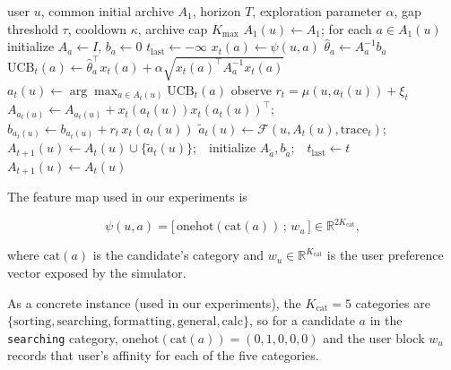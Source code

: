 \documentclass{article} %
\renewcommand{\eqref}[1]{\textup{(\ref{#1})}}
\begin{document}
\begin{algorithm}[t]
\caption{HyperRidge-Base (HRB): per-user routing over a growing archive}
\label{alg:router}
\begin{algorithmic}[1]
\Require user $u$, common initial archive $A_1$, horizon $T$, exploration parameter $\alpha$, gap threshold $\tau$, cooldown $\kappa$, archive cap $K_{\max}$
\State $A_1(u) \gets A_1$; for each $a \in A_1(u)$ initialize $A_a \gets I$, $b_a \gets 0$
\State $t_{\mathrm{last}} \gets -\infty$
        \State $x_t(a) \gets \psi(u,a)$ \Comment{feature map, \eqref{eq:method-feat}}
        \State $\hat\theta_a \gets A_a^{-1} b_a$
        \State $\mathrm{UCB}_t(a) \gets \hat\theta_a^\top x_t(a) + \alpha \sqrt{x_t(a)^\top A_a^{-1} x_t(a)}$
    \EndFor
    \State $a_t(u) \gets \arg\max_{a \in A_t(u)} \mathrm{UCB}_t(a)$
    \State observe $r_t = \mu(u, a_t(u)) + \xi_t$
    \State $A_{a_t(u)} \gets A_{a_t(u)} + x_t(a_t(u)) x_t(a_t(u))^\top$;\quad $b_{a_t(u)} \gets b_{a_t(u)} + r_t \, x_t(a_t(u))$
     
        \State $\tilde a_t(u) \gets \mathcal{F}(u, A_t(u), \mathrm{trace}_t)$;\ \ $A_{t+1}(u) \gets A_t(u) \cup \{\tilde a_t(u)\}$;\ \ initialize $A_{\tilde a}, b_{\tilde a}$;\ \ $t_{\mathrm{last}} \gets t$
    \Else
        \State $A_{t+1}(u) \gets A_t(u)$
    \EndIf
\EndFor
\end{algorithmic}
\end{algorithm}

The feature map used in our experiments is

\begin{equation}
\label{eq:method-feat}
\psi(u,a) = \big[\,\mathrm{onehot}(\mathrm{cat}(a))\,;\, w_u\,\big] \in \mathbb{R}^{2K_{\mathrm{cat}}},
\end{equation}

where $\mathrm{cat}(a)$ is the candidate's category and $w_u \in \mathbb{R}^{K_{\mathrm{cat}}}$ is the user preference vector exposed by the simulator.

As a concrete instance (used in our experiments), the $K_{\mathrm{cat}}=5$ categories are $\{\text{sorting}, \text{searching}, \text{formatting}, \text{general}, \text{calc}\}$, so for a candidate $a$ in the \texttt{searching} category, $\mathrm{onehot}(\mathrm{cat}(a))=(0,1,0,0,0)$ and the user block $w_u$ records that user's affinity for each of the five categories.
\end{document}
